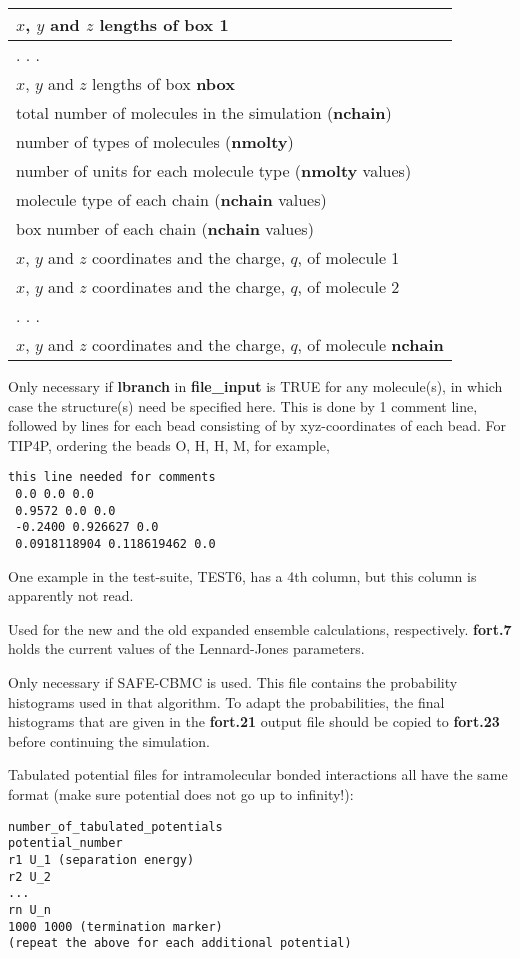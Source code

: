 \documentclass[12pt,letterpaper]{article}
\begin{document}
\begin{center}
\begin{tabular}{| l |}
$x$, $y$ and $z$ lengths of box 1  \\ \hline
  . . . \\ \hline
$x$, $y$ and $z$ lengths of box {\bf nbox} \\ \hline
total number of molecules in the simulation ({\bf nchain}) \\ \hline
number of types of molecules ({\bf nmolty}) \\ \hline
number of units for each molecule type ({\bf nmolty} values) \\ \hline
molecule type of each chain ({\bf nchain} values) \\ \hline
box number of each chain ({\bf nchain} values) \\ \hline
$x$, $y$ and $z$ coordinates and the charge, $q$, of molecule 1 \\ \hline
$x$, $y$ and $z$ coordinates and the charge, $q$, of molecule 2 \\ \hline
  . . . \\ \hline
$x$, $y$ and $z$ coordinates and the charge, $q$, of molecule {\bf nchain} \\
  \hline
\end{tabular}
\end{center}

 Only necessary if {\bf lbranch}
in {\bf file\_input} is TRUE for any molecule(s), in which
case the structure(s) need be specified here. This is done
by 1 comment line, followed by lines for each bead consisting 
of by xyz-coordinates of each bead. For TIP4P, ordering the 
beads O, H, H, M, for example, 
\begin{verbatim}
this line needed for comments
 0.0 0.0 0.0
 0.9572 0.0 0.0
 -0.2400 0.926627 0.0
 0.0918118904 0.118619462 0.0
\end{verbatim}
One example in the test-suite, TEST6, has a 4th column, but
this column is apparently not read.


 Used for the new and the old
expanded ensemble calculations, respectively. {\bf fort.7}
holds the current values of the Lennard-Jones parameters.

 Only necessary if SAFE-CBMC is used.
This file contains the probability histograms used in that
algorithm. To adapt the probabilities, the final histograms
that are given in the {\bf fort.21} output file should be
copied to {\bf fort.23} before continuing the simulation.

 Tabulated potential
files for intramolecular bonded interactions all have the
same format (make sure potential does not go up to
infinity!):
\begin{verbatim}
number_of_tabulated_potentials
potential_number
r1 U_1 (separation energy)
r2 U_2
...
rn U_n
1000 1000 (termination marker)
(repeat the above for each additional potential)
\end{verbatim}
\end{document}
